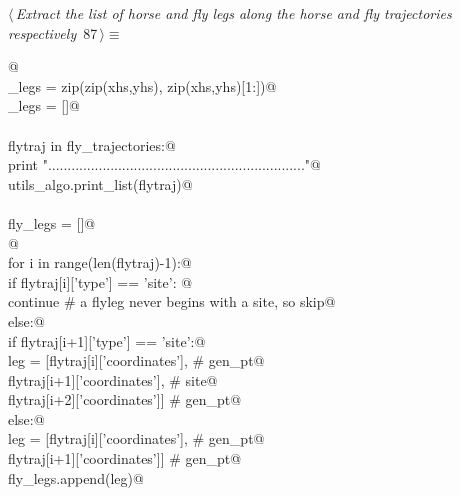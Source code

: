 \documentclass[11.5pt]{report}
\begin{document}
\vspace{-0.8cm} \newchunk
\begin{flushleft} \small
\begin{minipage}{\linewidth}\label{scrap138}\raggedright\small
{} $\langle\,${\itshape Extract the list of horse and fly legs along the horse and fly trajectories respectively}\nobreak\ {\footnotesize {87}}$\,\rangle\equiv$
\vspace{-1ex}
\begin{list}{}{} \item
\mbox{}\verb@   @\\
\mbox{}\verb@horse_legs = zip(zip(xhs,yhs), zip(xhs,yhs)[1:])@\\
\mbox{}\verb@flies_legs = []@\\
\mbox{}\verb@@\\
\mbox{}\verb@for flytraj in fly_trajectories:@\\
\mbox{}\verb@    print ".................................................................."@\\
\mbox{}\verb@    utils_algo.print_list(flytraj)@\\
\mbox{}\verb@@\\
\mbox{}\verb@    fly_legs = []@\\
\mbox{}\verb@    @\\
\mbox{}\verb@    for i in range(len(flytraj)-1):@\\
\mbox{}\verb@          if flytraj[i]['type'] == 'site': @\\
\mbox{}\verb@              continue                                  # a flyleg never begins with a site, so skip@\\
\mbox{}\verb@          else:@\\
\mbox{}\verb@              if flytraj[i+1]['type'] == 'site':@\\
\mbox{}\verb@                  leg = [flytraj[i]['coordinates'],     # gen_pt@\\
\mbox{}\verb@                         flytraj[i+1]['coordinates'],   # site@\\
\mbox{}\verb@                         flytraj[i+2]['coordinates']]   # gen_pt@\\
\mbox{}\verb@              else:@\\
\mbox{}\verb@                  leg = [flytraj[i]['coordinates'],     # gen_pt@\\
\mbox{}\verb@                         flytraj[i+1]['coordinates']]   # gen_pt@\\
\mbox{}\verb@              fly_legs.append(leg)@\\

\end{list}
\end{minipage}
\end{flushleft}
\end{document}
